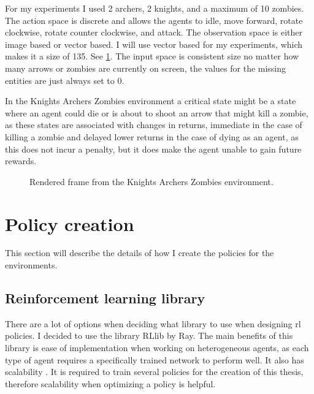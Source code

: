 \documentclass[UKenglish]{uiomasterthesis}
\begin{document}
For my experiments I used 2 archers, 2 knights, and a maximum of 10 zombies. The action space is discrete and allows the agents to idle, move forward, rotate clockwise, rotate counter clockwise, and attack. The observation space is either image based or vector based. I will use vector based for my experiments, which makes it a size of 135. See \cref{fig:kaz_env}. The input space is consistent size no matter how many arrows or zombies are currently on screen, the values for the missing entities are just always set to 0.

In the Knights Archers Zombies environment a critical state might be a state where an agent could die or is about to shoot an arrow that might kill a zombie, as these states are associated with changes in returns, immediate in the case of killing a zombie and delayed lower returns in the case of dying as an agent, as this does not incur a penalty, but it does make the agent unable to gain future rewards.

\begin{figure}[hbtp]
    \centering
    \caption{Rendered frame from the Knights Archers Zombies environment.}
    \label{fig:kaz_env}
\end{figure}

\section{Policy creation}
This section will describe the details of how I create the policies for the environments.

\subsection{Reinforcement learning library}
There are a lot of options when deciding what library to use when designing \ac{rl} policies. I decided to use the library RLlib by Ray. The main benefits of this library is ease of implementation when working on heterogeneous agents, as each type of agent requires a specifically trained network to perform well. It also has scalability \cite{rayrllib}. It is required to train several policies for the creation of this thesis, therefore scalability when optimizing a policy is helpful.
\end{document}
